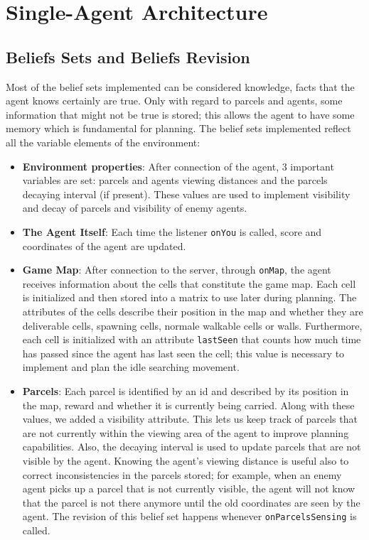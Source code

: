 \documentclass[a4paper, 11pt]{article}
\begin{document}
\pagebreak


\section{Single-Agent Architecture}


\subsection{Beliefs Sets and Beliefs Revision}
Most of the belief sets implemented can be considered knowledge, facts that the agent knows certainly are true. Only with regard to parcels and agents, some information that might not be true is stored; this allows the agent to have some memory which is fundamental for planning. The belief sets implemented reflect all the variable elements of the environment:
\begin{itemize}
\item \textbf{Environment properties}: After connection of the agent, 3 important variables are set: parcels and agents viewing distances and the parcels decaying interval (if present). These values are used to implement visibility and decay of parcels and visibility of enemy agents.
\item \textbf{The Agent Itself}: Each time the listener \verb|onYou| is called, score and coordinates of the agent are updated.
\item \textbf{Game Map}: After connection to the server, through \verb|onMap|, the agent receives  information about the cells that constitute the game map. Each cell is initialized and then stored into a matrix to use later during planning. The attributes of the cells describe their position in the map and whether they are deliverable cells, spawning cells, normale walkable cells or walls. Furthermore, each cell is initialized with an attribute \verb|lastSeen| that counts how much time has passed since the agent has last seen the cell; this value is necessary to implement and plan the idle searching movement.
\item \textbf{Parcels}: Each parcel is identified by an id and described by its position in the map, reward and whether it is currently being carried. Along with these values, we added a visibility attribute. This lets us keep track of parcels that are not currently within the viewing area of the agent to improve planning capabilities. Also, the decaying interval is used to update parcels that are not visible by the agent. Knowing the agent's viewing distance is useful also to correct inconsistencies in the parcels stored; for example, when an enemy agent picks up a parcel that is not currently visible, the agent will not know that the parcel is not there anymore until the old coordinates are seen by the agent. The revision of this belief set happens whenever \verb|onParcelsSensing| is called.

\end{itemize}
\end{document}
